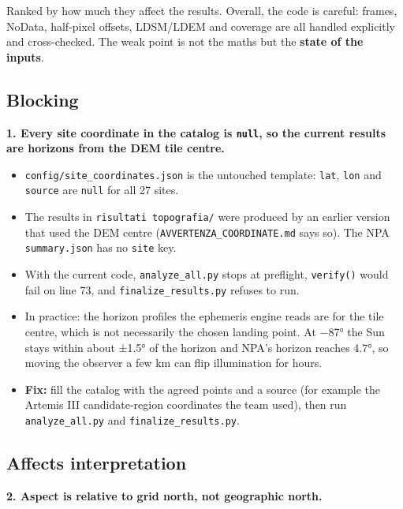 \documentclass[11pt,a4paper]{article}
\providecommand{\tightlist}{\setlength{\itemsep}{0pt}\setlength{\parskip}{0pt}}
\begin{document}
Ranked by how much they affect the results. Overall, the code is
careful: frames, NoData, half-pixel offsets, LDSM/LDEM and coverage are
all handled explicitly and cross-checked. The weak point is not the
maths but the \textbf{state of the inputs}.

\hypertarget{blocking}{%
\subsection{Blocking}\label{blocking}}

\textbf{1. Every site coordinate in the catalog is
\texttt{null}, so the current results are horizons from
the DEM tile centre.}

\begin{itemize}
\tightlist
\item
  \texttt{config/site\_coordinates.json} is the
  untouched template: \texttt{lat},
  \texttt{lon} and \texttt{source} are
  \texttt{null} for all 27 sites.
\item
  The results in \texttt{risultati topografia/} were
  produced by an earlier version that used the DEM centre
  (\texttt{AVVERTENZA\_COORDINATE.md} says so). The NPA
  \texttt{summary.json} has no
  \texttt{site} key.
\item
  With the current code, \texttt{analyze\_all.py} stops
  at preflight, \texttt{verify()} would fail on line
  73, and \texttt{finalize\_results.py} refuses to run.
\item
  In practice: the horizon profiles the ephemeris engine reads are for
  the tile centre, which is not necessarily the chosen landing point. At
  −87° the Sun stays within about ±1.5° of the horizon and NPA's horizon
  reaches 4.7°, so moving the observer a few km can flip illumination
  for hours.
\item
  \textbf{Fix:} fill the catalog with the agreed points and a source
  (for example the Artemis III candidate-region coordinates the team
  used), then run \texttt{analyze\_all.py} and
  \texttt{finalize\_results.py}.
\end{itemize}

\hypertarget{affects-interpretation}{%
\subsection{Affects interpretation}\label{affects-interpretation}}

\textbf{2. Aspect is relative to grid north, not geographic north.}
\end{document}
